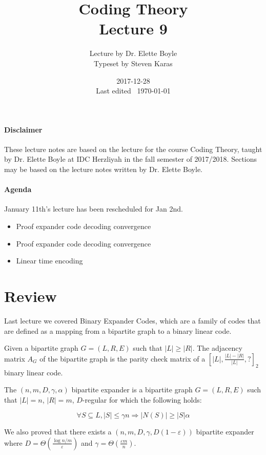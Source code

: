 \documentclass{idc_msc}
\title{Coding Theory\\\large Lecture 9}
\date{2017-12-28 \\ Last edited \currenttime\ \today}
\author{Lecture by Dr. Elette Boyle\\Typeset by Steven Karas}
\begin{document}
\maketitle

\paragraph{Disclaimer}

These lecture notes are based on the lecture for the course Coding Theory, taught by Dr. Elette Boyle at IDC Herzliyah in the fall semester of 2017/2018.
Sections may be based on the lecture notes written by Dr. Elette Boyle.

\paragraph{Agenda}

January 11th's lecture has been rescheduled for Jan 2nd.

\begin{itemize}
  \item Proof expander code decoding convergence
  \item Proof expander code decoding convergence
  \item Linear time encoding
\end{itemize}

\section{Review}

Last lecture we covered Binary Expander Codes, which are a family of codes that are defined as a mapping from a bipartite graph to a binary linear code.

Given a bipartite graph \(G = (L, R, E)\) such that \(|L| \ge |R|\). The adjacency matrix \(A_G\) of the bipartite graph is the parity check matrix of a \([|L|,\frac{|L|-|R|}{|L|},?]_2\) binary linear code.

The \((n,m,D,\gamma,\alpha)\) bipartite expander is a bipartite graph \(G=(L,R,E)\) such that \(|L|=n\), \(|R|=m\), \(D\)-regular for which the following holds:

\[\forall S\subseteq L, |S| \le \gamma n \Rightarrow |N(S)| \ge |S|\alpha\]

We also proved that there exists a \((n,m,D,\gamma,D(1-\varepsilon))\) bipartite expander where \(D = \Theta\left(\frac{\log n/m}{\varepsilon}\right)\) and \(\gamma = \Theta\left(\frac{\varepsilon m}{n}\right)\).
\end{document}
